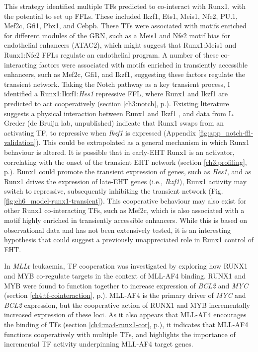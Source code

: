 This strategy identified multiple TFs predicted to co-interact with Runx1, with the potential to set up FFLs. These included Ikzf1, Ets1, Meis1, Nfe2, PU.1, Mef2c, Gfi1, Pbx1, and Cebpb. These TFs were associated with motifs enriched for different modules of the GRN, such as a Meis1 and Nfe2 motif bias for endothelial enhancers (ATAC2), which might suggest that Runx1:Meis1 and Runx1:Nfe2 FFLs regulate an endothelial program. A number of these co-interacting factors were associated with motifs enriched in transiently accessible enhancers, such as Mef2c, Gfi1, and Ikzf1, suggesting these factors regulate the transient network. Taking the Notch pathway as a key transient process, I identified a Runx1:Ikzf1:\textit{Hes1} repressive FFL, where Runx1 and Ikzf1 are predicted to act cooperatively (section \ref{ch3:notch}, p.\pageref{ch3:notch}). Existing literature suggests a physical interaction between Runx1 and Ikzf1 \citep{zhou_runx_2019}, and data from L. Greder (de Bruijn lab, unpublished) indicate that Runx1 swaps from an activating TF, to repressive when \textit{Ikzf1} is expressed (Appendix \ref{fig:app_notch-ffl-validation}). This could be extrapolated as a general mechanism in which Runx1 behaviour is altered. It is possible that in early-EHT Runx1 is an activator, correlating with the onset of the transient EHT network (section \ref{ch3:profiling}, p.\pageref{ch3:profiling}). Runx1 could promote the transient expression of genes, such as \textit{Hes1}, and as Runx1 drives the expression of late-EHT genes (i.e., \textit{Ikzf1}), Runx1 activity may switch to repressive, subsequently inhibiting the transient network (Fig. \ref{fig:ch6_model-runx1-transient}). This cooperative behaviour may also exist for other Runx1 co-interacting TFs, such as Mef2c, which is also associated with a motif highly enriched in transiently accessible enhancers. While this is based on observational data and has not been extensively tested, it is an interesting hypothesis that could suggest a previously unappreciated role in Runx1 control of EHT.

In \textit{MLL}r leukaemia, TF cooperation was investigated by exploring how RUNX1 and MYB co-regulate targets in the context of MLL-AF4 binding. RUNX1 and MYB were found to function together to increase expression of \textit{BCL2} and \textit{MYC} (section \ref{ch4:tf-cointeraction}, p.\pageref{ch4:tf-cointeraction}). MLL-AF4 is the primary driver of \textit{MYC} and \textit{BCL2} expression, but the cooperative action of RUNX1 and MYB incrementally increased expression of these loci. As it also appears that MLL-AF4 encourages the binding of TFs (section \ref{ch4:ma4-runx1-cor}, p.\pageref{ch4:ma4-runx1-cor}), it indicates that MLL-AF4 functions cooperatively with multiple TFs, and highlights the importance of incremental TF activity underpinning MLL-AF4 target genes.

